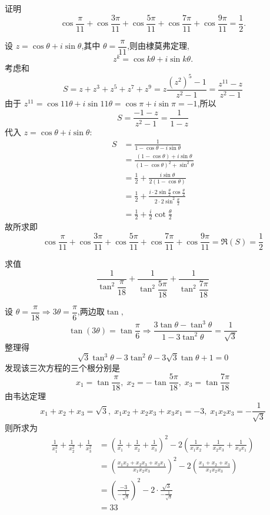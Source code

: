 \begin{questions}
    \question 证明
    \[
    \cos \frac{\pi}{11} + \cos \frac{3\pi}{11} + \cos \frac{5\pi}{11} + \cos \frac{7\pi}{11} + \cos \frac{9\pi}{11} = \frac{1}{2}.
    \]
    \begin{solution}
        设 $z = \cos \theta + i \sin \theta$,其中 $\theta = \dfrac{\pi}{11}$,则由棣莫弗定理,
        \[
        z^k = \cos k\theta + i \sin k\theta.
        \]
        考虑和
        \[
        S = z + z^3 + z^5 + z^7 + z^9=z \frac{(z^2)^5 - 1}{z^2 - 1}=\frac{z^{11} - z}{z^2 - 1}
        \]
        由于 $z^{11} = \cos 11\theta + i \sin 11\theta = \cos \pi + i \sin \pi = -1$,所以
        \[
        S = \frac{-1 - z}{z^2 - 1} = \frac{1}{1-z}
        \]
        代入 $z = \cos \theta + i \sin \theta$:
        \begin{align*}
        S &= \frac{1}{1-\cos \theta - i \sin \theta} \\
        &= \frac{(1-\cos \theta) + i \sin \theta}{(1-\cos \theta)^2 + \sin^2 \theta} \\
        &= \frac{1}{2} + \frac{i \sin \theta}{2(1-\cos \theta)} \\
        &= \frac{1}{2} + \frac{i \cdot 2 \sin \frac{\theta}{2} \cos \frac{\theta}{2}}{2 \cdot 2 \sin^2 \frac{\theta}{2}} \\
        &= \frac{1}{2} + \frac{i}{2} \cot \frac{\theta}{2}
        \end{align*}
        故所求即
        \[
        \cos \frac{\pi}{11} + \cos \frac{3\pi}{11} + \cos \frac{5\pi}{11} + \cos \frac{7\pi}{11} + \cos \frac{9\pi}{11} = \Re(S)= \frac{1}{2}
        \]
    \end{solution}

    \question 求值 
    \[
    \frac{1}{\tan^2{\dfrac{\pi}{18}}}+\frac{1}{\tan^2{\dfrac{5\pi}{18}}}+\frac{1}{\tan^2{\dfrac{7\pi}{18}}}
    \]
    \begin{solution}
        设 \(\theta = \dfrac{\pi}{18} \Rightarrow 3\theta = \dfrac{\pi}{6}\),两边取$\tan,$
        \[
        \tan(3\theta) = \tan\frac{\pi}{6} \Rightarrow \frac{3\tan\theta - \tan^3\theta}{1 - 3\tan^2\theta} = \frac{1}{\sqrt{3}}
        \]
        整理得
        \[
        \sqrt{3}\tan^3\theta - 3\tan^2\theta - 3\sqrt{3}\tan\theta + 1 = 0
        \]
        发现该三次方程的三个根分别是
        \[
        x_1 = \tan\frac{\pi}{18},\; x_2 = -\tan\frac{5\pi}{18},\; x_3 = \tan\frac{7\pi}{18}
        \]
        由韦达定理
        \[
        x_1 + x_2 + x_3 = \sqrt 3,\;
        x_1x_2 + x_2x_3 + x_3x_1 = -3,\;
        x_1x_2x_3 = -\frac{1}{\sqrt3}
        \]
        则所求为
        \begin{align*}
        \frac{1}{x_1^2} + \frac{1}{x_2^2} + \frac{1}{x_3^2} &= \left( \frac{1}{x_1} + \frac{1}{x_2} + \frac{1}{x_3} \right)^2 - 2\left( \frac{1}{x_1x_2} + \frac{1}{x_2x_3} + \frac{1}{x_3x_1} \right)  \\
        &=\left(\frac{x_1x_2 + x_2x_3 + x_3x_1}{x_1x_2x_3}\right)^2-2\left(\frac{x_1 + x_2 + x_3}{x_1x_2x_3}\right)\\
        &= \left( \frac{-3}{-\frac{1}{\sqrt{3}}} \right)^2 - 2 \cdot \frac{\sqrt{3}}{-\frac{1}{\sqrt{3}}} \\
        &= 33
        \end{align*}
    \end{solution}


\end{questions}
